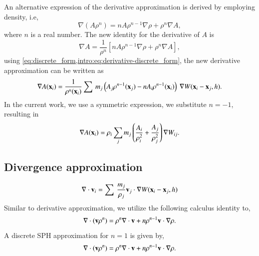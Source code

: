 An alternative expression of the derivative approximation is derived by employing
density, i.e,
\begin{equation}
  \label{intro:eq:sph-continu-derivative-final}
  \nabla (A \rho^n) = n A \rho^{n - 1} \nabla \rho + \rho^n \nabla A,
\end{equation}
where $n$ is a real number. The new identity for the derivative of $A$ is
\begin{equation}
  \nabla A = \frac{1}{\rho^n} \left[ n A \rho^{n - 1} \nabla \rho + \rho^n \nabla A  \right],
\end{equation}
using \cref{eq:discrete_form,intro:eq:derivative-discrete_form}, the new
derivative approximation can be written as
\begin{equation}
  \label{intro:eq:derivative-discrete_form}
  \nabla A(\mathbf{x}_i) = \frac{1}{\rho^n(\mathbf{x}_i)} \sum\>
  m_j \left(A_j \rho^{n-1}(\mathbf{x}_j) - n A_i \rho^{n-1}(\mathbf{x}_i) \right)\> \nabla W(\mathbf{x}_i - \mathbf{x}_j, h).
\end{equation}
In the current work, we use a symmetric expression, we substitute $n=-1$, resulting in
\begin{equation}
  \nabla A(\mathbf{x}_i) = \rho_i \sum_{j} m_j \left(\frac{A_i}{\rho_i^2} + \frac{A_j}{\rho_j^2}\right) \nabla W_{ij}.
\end{equation}



\subsection{Divergence approximation}
\begin{equation}
  \label{intro:eq:discrete_derivative}
  \nabla \cdot \mathbf{v}_i = \sum\> \frac{m_j}{\rho_j} \mathbf{v}_j \cdot \nabla W(\mathbf{x}_i - \mathbf{x}_j, h)
\end{equation}
Similar to derivative approximation, we utilize the following calculus identity to,
\begin{equation}
  \label{intro:eq:sph-continu-div-intermediate}
  \nabla \cdot (\mathbf{v} \rho^n) = \rho^n \nabla \cdot \mathbf{v} + n  \rho^{n - 1} \mathbf{v} \cdot \nabla \rho.
\end{equation}
A discrete SPH approximation for $n=1$ is given by,
\begin{equation}
  \label{intro:eq:sph-continu-div-final}
  \nabla \cdot (\mathbf{v} \rho^n) = \rho^n \nabla \cdot \mathbf{v} + n  \rho^{n - 1} \mathbf{v} \cdot \nabla \rho.
\end{equation}



